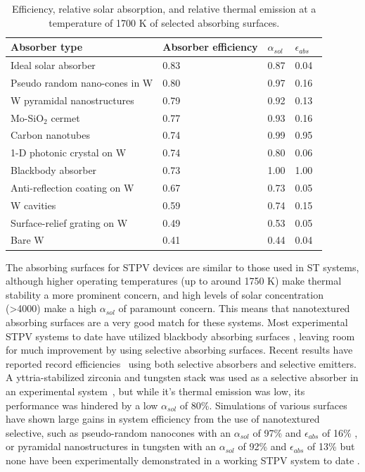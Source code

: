 \documentclass[review]{elsarticle}
\begin{document}
\begin{table}
	\caption{Efficiency, relative solar absorption, and relative thermal emission at a temperature of 1700 K of selected absorbing surfaces.}
	\label{abs_eff_table}
	\begin{center}
		\begin{tabular}{|llll|}
			\hline
			Absorber type & Absorber efficiency & $\alpha_{sol}$ & $\epsilon_{abs}$\\
			\hline	
			Ideal solar absorber & 0.83 & 0.87 & 0.04\\
			Pseudo random nano-cones in W & 0.80 & 0.97 & 0.16~\cite{me1}\\
			W pyramidal nanostructures & 0.79 & 0.92 & 0.13~\cite{paper1_ref4}\\
			Mo-SiO$_2$ cermet & 0.77 & 0.93 & 0.16~\cite{cermet6}\\
			Carbon nanotubes & 0.74 & 0.99 & 0.95~\cite{MIT_paper,nnnNature}\\
			1-D photonic crystal on W & 0.74 & 0.80 & 0.06~\cite{SKY_JPE_2015}\\
			Blackbody absorber & 0.73 & 1.00 & 1.00\\
			Anti-reflection coating on W & 0.67 & 0.73 & 0.05~\cite{SKY_JPE_2015}\\
			W cavities & 0.59 & 0.74 & 0.15~\cite{exp_russia}\\
			Surface-relief grating on W & 0.49 & 0.53 & 0.05~\cite{paper1_ref6}\\
			Bare W & 0.41 & 0.44 & 0.04~\cite{palik}\\
			\hline
		\end{tabular}
	\end{center}
\end{table}

The absorbing surfaces for STPV devices are similar to those used in ST systems, although higher operating temperatures (up to around 1750 K) 
make thermal stability a more prominent concern, and high levels of solar concentration (\textgreater4000) make a high $\alpha_{sol}$ of 
paramount concern.  This means that nanotextured absorbing surfaces are a very good match for these systems.  Most experimental STPV systems 
to date have utilized blackbody absorbing surfaces \cite{exp_tokyo,exp_madrid,exp_russia,MIT_paper}, leaving room for much improvement by using 
selective absorbing surfaces. Recent results have reported record efficiencies~\cite{g11,SKY_JPE_2015} using both 
selective absorbers and selective emitters. A yttria-stabilized zirconia and tungsten stack was used as a selective absorber in an experimental system~\cite{SKY_JPE_2015}, 
but while it's thermal emission was low, its performance was hindered by a low $\alpha_{sol}$ of 80\%.  Simulations of various surfaces 
have shown large gains in system efficiency from the use of nanotextured selective, such as pseudo-random 
nanocones with an $\alpha_{sol}$ of 97\% and $\epsilon_{abs}$ of 16\% \cite{me1}, or pyramidal nanostructures in tungsten 
with an $\alpha_{sol}$ of 92\% and $\epsilon_{abs}$ of 13\% \cite{paper1_ref4} but none have been experimentally 
demonstrated in a working STPV system to date \cite{paper1_ref5,paper1_ref6}.
\end{document}
